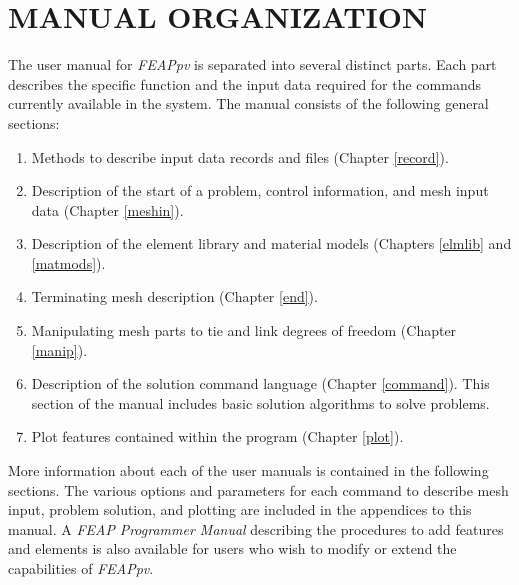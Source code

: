 \chapter[Manual Organization]{MANUAL ORGANIZATION}
\label{organ}

The user manual for {\sl FEAPpv} is separated into several distinct
parts.  Each part describes the specific function and
the input data required for the commands currently available
in the system.  The manual consists of the following general sections:
\begin{enumerate}
\item
Methods to describe input data records and files (Chapter \ref{record}).
\item
Description of the start of a problem,
control information, and mesh input data (Chapter \ref{meshin}).
\item
Description of the element library and material models
(Chapters \ref{elmlib} and \ref{matmods}).
\item
Terminating mesh description (Chapter \ref{end}).
\item
Manipulating mesh parts to tie and link degrees of freedom (Chapter 
\ref{manip}).
\item
Description of the solution command language (Chapter \ref{command}).
This section of the manual includes basic solution algorithms to solve
problems.
\item
Plot features contained within the program (Chapter \ref{plot}).
\end{enumerate}
More information about each of the user manuals is contained in the
following sections.
The various options and parameters for each command to describe
mesh input, problem solution, and plotting are included
in the appendices to this manual.
A \textsl{FEAP} \textit{Programmer Manual} describing the procedures to
add features and elements is also 
available for users who wish to modify or extend the capabilities of {\sl FEAPpv}.
